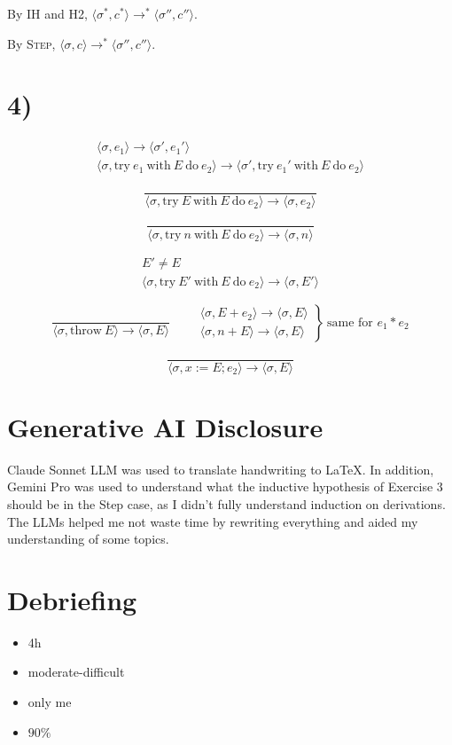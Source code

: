 \documentclass[11pt]{article}
\newcommand{\conf}[2]{\langle #1, #2 \rangle}
\newcommand{\step}{\longrightarrow}
\newcommand{\steps}{\longrightarrow^{*}}
\newcommand{\infrule}[2]{%
  \begin{array}{c}
    #1 \\ \hline #2
  \end{array}%
}
\begin{document}
By IH and H2, $\conf{\sigma^{*}}{c^{*}} \steps \conf{\sigma''}{c''}$.

By \textsc{Step}, $\conf{\sigma}{c} \steps \conf{\sigma''}{c''}$.

\section*{4)}

\[
\infrule{\conf{\sigma}{e_1} \step \conf{\sigma'}{e_1'}}
     {\conf{\sigma}{\mathrm{try}\ e_1\ \mathrm{with}\ E\ \mathrm{do}\ e_2} \step \conf{\sigma'}{\mathrm{try}\ e_1'\ \mathrm{with}\ E\ \mathrm{do}\ e_2}}
\]

\bigskip

\[
\dfrac{}{\conf{\sigma}{\mathrm{try}\ E\ \mathrm{with}\ E\ \mathrm{do}\ e_2} \step \conf{\sigma}{e_2}}
\]

\bigskip

\[
\dfrac{}{\conf{\sigma}{\mathrm{try}\ n\ \mathrm{with}\ E\ \mathrm{do}\ e_2} \step \conf{\sigma}{n}}
\]

\bigskip

\[
\infrule{E' \neq E}
     {\conf{\sigma}{\mathrm{try}\ E'\ \mathrm{with}\ E\ \mathrm{do}\ e_2} \step \conf{\sigma}{E'}}
\]

\bigskip

\[
\dfrac{}{\conf{\sigma}{\mathrm{throw}\ E} \step \conf{\sigma}{E}}
\qquad
\left.
\infrule{\conf{\sigma}{E+e_2} \step \conf{\sigma}{E}}
     {\conf{\sigma}{n+E} \step \conf{\sigma}{E}}
\right\}\ \text{same for } e_1 * e_2
\]

\bigskip

\[
\dfrac{}{\conf{\sigma}{x := E; e_2} \step \conf{\sigma}{E}}
\]

\section*{Generative AI Disclosure}
Claude Sonnet LLM was used to translate handwriting to LaTeX. In addition, Gemini Pro was used to understand what the inductive hypothesis of Exercise 3 should be in the Step case, as I didn't fully understand induction on derivations. The LLMs helped me not waste time by rewriting everything and aided my understanding of some topics.

\section*{Debriefing}
\begin{itemize}
\item 4h
\item moderate-difficult
\item only me
\item $ 90\% $
\end{itemize}
\end{document}
